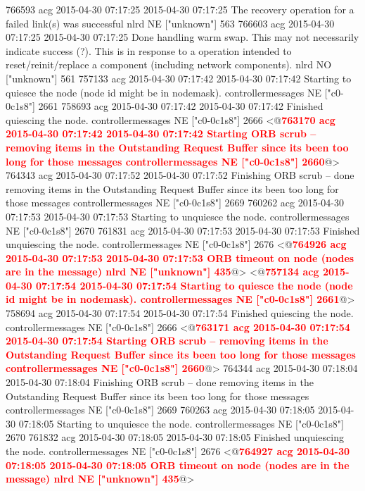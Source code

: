 \begin{figure*}
\begin{annol}
766593	acg	2015-04-30 07:17:25	2015-04-30 07:17:25		The recovery operation for a failed link(s) was successful	nlrd	NE	["unknown"]	563
766603	acg	2015-04-30 07:17:25	2015-04-30 07:17:25		Done handling warm swap. This may not necessarily indicate success (?). This is in response to a operation intended to reset/reinit/replace a component (including network components).		nlrd	NO	["unknown"]	561
757133	acg	2015-04-30 07:17:42	2015-04-30 07:17:42		Starting to quiesce the node (node id might be in nodemask).		controllermessages	NE	["c0-0c1s8"]	2661
758693	acg	2015-04-30 07:17:42	2015-04-30 07:17:42		Finished quiescing the node.		controllermessages	NE	["c0-0c1s8"]	2666
<@\textbf{\textcolor{red}{763170	acg	2015-04-30 07:17:42	2015-04-30 07:17:42		Starting ORB scrub -- removing items in the Outstanding Request Buffer since its been too long for those messages	controllermessages	NE	["c0-0c1s8"]	2660}}@>
764343	acg	2015-04-30 07:17:52	2015-04-30 07:17:52		Finishing ORB scrub -- done removing items in the Outstanding Request Buffer since its been too long for those messages	controllermessages	NE	["c0-0c1s8"]	2669
760262	acg	2015-04-30 07:17:53	2015-04-30 07:17:53		Starting to unquiesce the node.		controllermessages	NE	["c0-0c1s8"]	2670
761831	acg	2015-04-30 07:17:53	2015-04-30 07:17:53		Finished unquiescing the node.		controllermessages	NE	["c0-0c1s8"]	2676
<@\textbf{\textcolor{red}{764926	acg	2015-04-30 07:17:53	2015-04-30 07:17:53		ORB timeout on node (nodes are in the message)		nlrd	NE	["unknown"]	435}}@>
<@\textbf{\textcolor{red}{757134	acg	2015-04-30 07:17:54	2015-04-30 07:17:54		Starting to quiesce the node (node id might be in nodemask).		controllermessages	NE	["c0-0c1s8"]	2661}}@>
758694	acg	2015-04-30 07:17:54	2015-04-30 07:17:54		Finished quiescing the node.		controllermessages	NE	["c0-0c1s8"]	2666
<@\textbf{\textcolor{red}{763171	acg	2015-04-30 07:17:54	2015-04-30 07:17:54		Starting ORB scrub -- removing items in the Outstanding Request Buffer since its been too long for those messages	controllermessages	NE	["c0-0c1s8"]	2660}}@>
764344	acg	2015-04-30 07:18:04	2015-04-30 07:18:04		Finishing ORB scrub -- done removing items in the Outstanding Request Buffer since its been too long for those messages	controllermessages	NE	["c0-0c1s8"]	2669
760263	acg	2015-04-30 07:18:05	2015-04-30 07:18:05		Starting to unquiesce the node.		controllermessages	NE	["c0-0c1s8"]	2670
761832	acg	2015-04-30 07:18:05	2015-04-30 07:18:05		Finished unquiescing the node.		controllermessages	NE	["c0-0c1s8"]	2676
<@\textbf{\textcolor{red}{764927	acg	2015-04-30 07:18:05	2015-04-30 07:18:05		ORB timeout on node (nodes are in the message)		nlrd	NE	["unknown"]	435}}@>


\end{annol}
\end{figure*}
